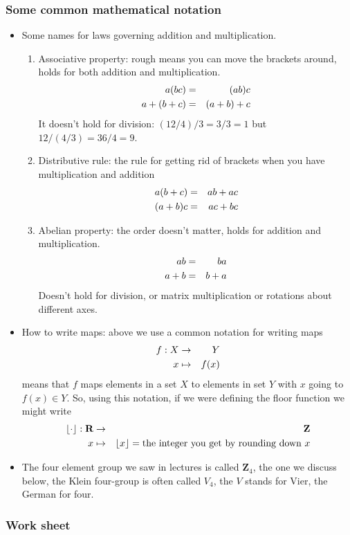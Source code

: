 \documentclass[12pt]{article}
\begin{document}
\subsubsection*{Some common mathematical notation}
\begin{itemize}
\item Some names for laws governing addition and multiplication.
\begin{enumerate}
\item Associative property: rough means you can move the brackets around, holds for both addition and multiplication. 
\begin{eqnarray}
a(bc)&=&(ab)c\cr
a+(b+c)&=&(a+b)+c
\end{eqnarray}
It doesn't hold for division: $(12/4)/3=3/3=1$ but $12/(4/3)=36/4=9$.
\item Distributive rule: the rule for getting rid of brackets when you have multiplication and addition
\begin{eqnarray}
a(b+c)&=&ab+ac\cr
(a+b)c&=&ac+bc
\end{eqnarray}
\item Abelian property: the order doesn't matter, holds for addition and multiplication.
\begin{eqnarray}
ab&=&ba\cr
a+b&=&b+a
\end{eqnarray}
Doesn't hold for division, or matrix multiplication or rotations about different axes.
\end{enumerate}
\item How to write maps: above we use a common notation for writing maps
\begin{eqnarray}
f:X&\rightarrow& Y\cr
  x&\mapsto& f(x)
\end{eqnarray}
means that $f$ maps elements in a set $X$ to elements in set $Y$ with $x$ going to $f(x)\in Y$. So, using this notation, if we were defining the floor function we might write
\begin{eqnarray}
\lfloor\cdot\rfloor: \textbf{R}&\rightarrow& \textbf{Z}\cr
x&\mapsto& \lfloor x\rfloor=\mbox{the integer you get by rounding down }x
\end{eqnarray}
\item The four element group we saw in lectures is called $\mathbf{Z}_4$, the one we discuss below, the Klein four-group is often called $V_4$, the $V$ stands for Vier, the German for four.
\end{itemize}


\subsubsection*{Work sheet}
\end{document}
